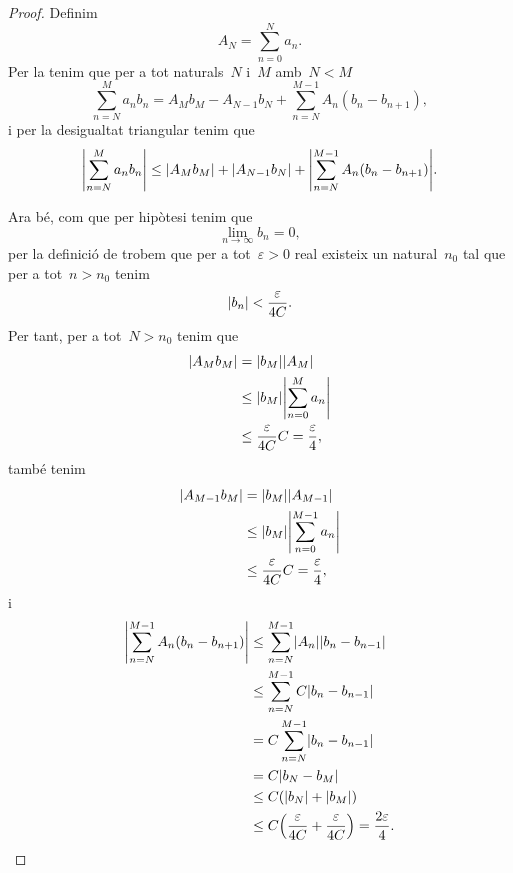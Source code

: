 \documentclass[../../main.tex]{subfiles}
\begin{document}
    \begin{proof}
        Definim
        \[
            A_{N}=\sum_{n=0}^{N}a_{n}.
        \]
        Per la  tenim que per a tot naturals~\(N\) i~\(M\) amb~\(N<M\)
        \[
            \sum_{n=N}^{M}a_{n}b_{n}=A_{M}b_{M}-A_{N-1}b_{N}+\sum_{n=N}^{M-1}A_{n}(b_{n}-b_{n+1}),
        \]
        i per la desigualtat triangular %
        tenim que
        \begin{equation}
            \label{thm:Teorema-de-Dirichlet-per-series-numeriques:eq1}
            \abs{\sum_{n=N}^{M}a_{n}b_{n}}\leq\abs{A_{M}b_{M}}+\abs{A_{N-1}b_{N}}+\abs{\sum_{n=N}^{M-1}A_{n}(b_{n}-b_{n+1})}.
        \end{equation}

        Ara bé, com que per hipòtesi tenim que
        \[
            \lim_{n\to\infty}b_{n}=0,
        \]
        per la definició de  trobem que per a tot~\(\varepsilon>0\) real existeix un natural~\(n_{0}\) tal que per a tot~\(n>n_{0}\) tenim
        \[
            \abs{b_{n}}<\frac{\varepsilon}{4C}.
        \]
        Per tant, per a tot~\(N>n_{0}\) tenim que
        \begin{align*}
            \abs{A_{M}b_{M}}&=\abs{b_{M}}\abs{A_{M}} \\
            &\leq\abs{b_{M}}\abs{\sum_{n=0}^{M}a_{n}} \\ %
            &\leq\frac{\varepsilon}{4C}C=\frac{\varepsilon}{4},
        \end{align*}
        també tenim
        \begin{align*}
            \abs{A_{M-1}b_{M}}&=\abs{b_{M}}\abs{A_{M-1}} \\
            &\leq\abs{b_{M}}\abs{\sum_{n=0}^{M-1}a_{n}} \\ %
            &\leq\frac{\varepsilon}{4C}C=\frac{\varepsilon}{4},
        \end{align*}
        i
        \begin{align*}
            \abs{\sum_{n=N}^{M-1}A_{n}(b_{n}-b_{n+1})}&\leq\sum_{n=N}^{M-1}\abs{A_{n}}\abs{b_{n}-b_{n-1}} \\
            &\leq\sum_{n=N}^{M-1}C\abs{b_{n}-b_{n-1}} \\
            &=C\sum_{n=N}^{M-1}\abs{b_{n}-b_{n-1}} \\
            &=C\abs{b_{N}-b_{M}} \\
            &\leq C(\abs{b_{N}}+\abs{b_{M}}) \\
            &\leq C\left(\frac{\varepsilon}{4C}+\frac{\varepsilon}{4C}\right)=\frac{2\varepsilon}{4}.

\end{align*}
\end{proof}
\end{document}
